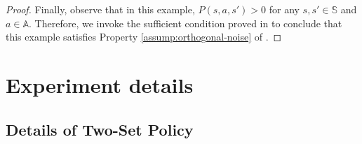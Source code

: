 \documentclass[11pt,letterpaper]{article}
\theoremstyle{plain}
\theoremstyle{definition}
\theoremstyle{remark}
\newcommand{\sspa}{\mathbb{S}}
\newcommand{\aspa}{\mathbb{A}}
\newcommand{\umat}{U}
\newcommand{\errtol}{\epsilon_N^{\text{rd}}}
\newcommand{\lamu}{\lambda_\umat}
\begin{document}
\begin{proof}
    Finally, observe that in this example, $P(s,a,s') > 0$ for any $s,s'\in\sspa$ and $a\in\aspa$. Therefore, we invoke the sufficient condition  proved in  to conclude that this example satisfies Property \ref{assump:orthogonal-noise} of . 
\end{proof}




\section{Experiment details}
\label{app:exp-details}


\subsection{Details of Two-Set Policy}
\label{app:exp-details:two-set}

\end{document}
